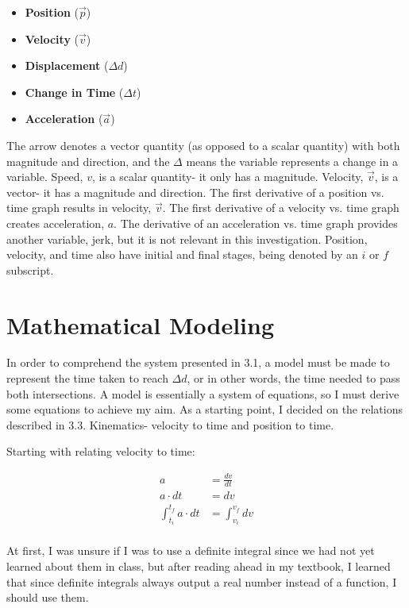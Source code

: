 \documentclass[11pt]{article}
\begin{document}
\begin{itemize}
    \item \textbf{Position} ($\vec{p}$)
    \item \textbf{Velocity} ($\vec{v}$)
    \item \textbf{Displacement} ($\Delta{d}$)
    \item \textbf{Change in Time} ($\Delta{t}$)
    \item \textbf{Acceleration} ($\vec{a}$)
\end{itemize}

The arrow denotes a vector quantity (as opposed to a scalar quantity) with both magnitude and direction, and the $\Delta$ means the variable represents a change in a variable. Speed, $v$, is a scalar quantity- it only has a magnitude. Velocity, $\vec{v}$, is a vector- it has a magnitude and direction. The first derivative of a position vs. time graph results in velocity, $\vec{v}$. The first derivative of a velocity vs. time graph creates acceleration, ${a}$. The derivative of an acceleration vs. time graph provides another variable, jerk, but it is not relevant in this investigation. Position, velocity, and time also have initial and final stages, being denoted by an $i$ or $f$ subscript.

\section{Mathematical Modeling}

In order to comprehend the system presented in 3.1, a model must be made to represent the time taken to reach $\Delta d$, or in other words, the time needed to pass both intersections. A model is essentially a system of equations, so I must derive some equations to achieve my aim. As a starting point, I decided on the relations described in 3.3. Kinematics- velocity to time and position to time.

Starting with relating velocity to time:

\begin{align*}
    a &= \frac{dv}{dt} \\
    a \cdot {dt} &= {dv} \\
    \int_{t_i}^{t_f} a \cdot dt &= \int_{v_i}^{v_f} dv \\
\end{align*}

At first, I was unsure if I was to use a definite integral since we had not yet learned about them in class, but after reading ahead in my textbook, I learned that since definite integrals always output a real number instead of a function, I should use them.
\end{document}
